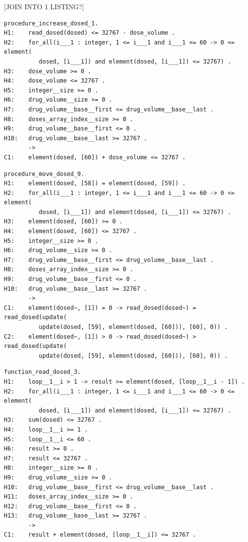 [JOIN INTO 1 LISTING?]
\singlespacing
\begin{lstlisting}[frame=single, gobble=0, caption={Undischarged Verification Condition from increase\_dosed.siv file}, label={listing:pcapump_undischarged_vc_increase_dosed}]
procedure_increase_dosed_1.
H1:    read_dosed(dosed) <= 32767 - dose_volume .
H2:    for_all(i___1 : integer, 1 <= i___1 and i___1 <= 60 -> 0 <= element(
          dosed, [i___1]) and element(dosed, [i___1]) <= 32767) .
H3:    dose_volume >= 0 .
H4:    dose_volume <= 32767 .
H5:    integer__size >= 0 .
H6:    drug_volume__size >= 0 .
H7:    drug_volume__base__first <= drug_volume__base__last .
H8:    doses_array_index__size >= 0 .
H9:    drug_volume__base__first <= 0 .
H10:   drug_volume__base__last >= 32767 .
       ->
C1:    element(dosed, [60]) + dose_volume <= 32767 .
\end{lstlisting}
\doublespacing

\singlespacing
\begin{lstlisting}[frame=single, gobble=0, caption={Undischarged Verification Condition from move\_dosed.siv file}, label={listing:pcapump_undischarged_vc_move_dosed}]
procedure_move_dosed_9.
H1:    element(dosed, [58]) = element(dosed, [59]) .
H2:    for_all(i___1 : integer, 1 <= i___1 and i___1 <= 60 -> 0 <= element(
          dosed, [i___1]) and element(dosed, [i___1]) <= 32767) .
H3:    element(dosed, [60]) >= 0 .
H4:    element(dosed, [60]) <= 32767 .
H5:    integer__size >= 0 .
H6:    drug_volume__size >= 0 .
H7:    drug_volume__base__first <= drug_volume__base__last .
H8:    doses_array_index__size >= 0 .
H9:    drug_volume__base__first <= 0 .
H10:   drug_volume__base__last >= 32767 .
       ->
C1:    element(dosed~, [1]) = 0 -> read_dosed(dosed~) = read_dosed(update(
          update(dosed, [59], element(dosed, [60])), [60], 0)) .
C2:    element(dosed~, [1]) > 0 -> read_dosed(dosed~) > read_dosed(update(
          update(dosed, [59], element(dosed, [60])), [60], 0)) .
\end{lstlisting}
\doublespacing

\singlespacing
\begin{lstlisting}[frame=single, gobble=0, caption={Undischarged Verification Condition from read\_dosed.siv file}, label={listing:pcapump_undischarged_vc_read_dosed}]
function_read_dosed_3.
H1:    loop__1__i > 1 -> result >= element(dosed, [loop__1__i - 1]) .
H2:    for_all(i___1 : integer, 1 <= i___1 and i___1 <= 60 -> 0 <= element(
          dosed, [i___1]) and element(dosed, [i___1]) <= 32767) .
H3:    sum(dosed) <= 32767 .
H4:    loop__1__i >= 1 .
H5:    loop__1__i <= 60 .
H6:    result >= 0 .
H7:    result <= 32767 .
H8:    integer__size >= 0 .
H9:    drug_volume__size >= 0 .
H10:   drug_volume__base__first <= drug_volume__base__last .
H11:   doses_array_index__size >= 0 .
H12:   drug_volume__base__first <= 0 .
H13:   drug_volume__base__last >= 32767 .
       ->
C1:    result + element(dosed, [loop__1__i]) <= 32767 .
\end{lstlisting}
\doublespacing

